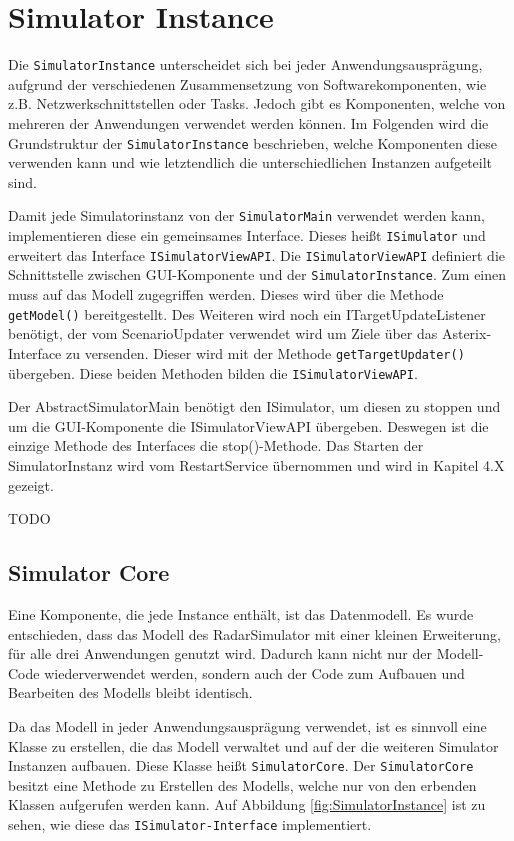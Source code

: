 \section{Simulator Instance}
Die \texttt{SimulatorInstance} unterscheidet sich bei jeder Anwendungsausprägung, aufgrund der verschiedenen Zusammensetzung von Softwarekomponenten, wie z.B. Netzwerkschnittstellen oder Tasks. Jedoch gibt es Komponenten, welche von mehreren der Anwendungen verwendet werden können. Im Folgenden wird die Grundstruktur der \texttt{SimulatorInstance} beschrieben, welche Komponenten diese verwenden kann und wie letztendlich die unterschiedlichen Instanzen aufgeteilt sind. 

Damit jede Simulatorinstanz von der \texttt{SimulatorMain} verwendet werden kann, implementieren diese ein gemeinsames Interface. Dieses heißt \texttt{ISimulator} und erweitert das Interface \texttt{ISimulatorViewAPI}. Die \texttt{ISimulatorViewAPI} definiert die Schnittstelle zwischen GUI-Komponente und der \texttt{SimulatorInstance}. Zum einen muss auf das Modell zugegriffen werden. Dieses wird über die Methode \texttt{getModel()} bereitgestellt. Des Weiteren wird noch ein ITargetUpdateListener benötigt, der vom ScenarioUpdater verwendet wird um Ziele über das Asterix-Interface zu versenden. Dieser wird mit der Methode \texttt{getTargetUpdater()} übergeben. Diese beiden Methoden bilden die \texttt{ISimulatorViewAPI}.

Der AbstractSimulatorMain benötigt den ISimulator, um diesen zu stoppen und um die GUI-Komponente die ISimulatorViewAPI übergeben. Deswegen ist die einzige Methode des Interfaces die stop()-Methode. Das Starten der SimulatorInstanz wird vom RestartService übernommen und wird in Kapitel 4.X gezeigt.

TODO

\subsection{Simulator Core}
Eine Komponente, die jede Instance enthält, ist das Datenmodell. Es wurde entschieden, dass das Modell des RadarSimulator mit einer kleinen Erweiterung, für alle drei Anwendungen genutzt wird. Dadurch kann nicht nur der Modell-Code wiederverwendet werden, sondern auch der Code zum Aufbauen und Bearbeiten des Modells bleibt identisch.

Da das Modell in jeder Anwendungsausprägung verwendet, ist es sinnvoll eine Klasse zu erstellen, die das Modell verwaltet und auf der die weiteren Simulator Instanzen aufbauen. Diese Klasse heißt \texttt{SimulatorCore}. Der \texttt{SimulatorCore} besitzt eine Methode zu Erstellen des Modells, welche nur von den erbenden Klassen aufgerufen werden kann. Auf Abbildung \ref{fig:SimulatorInstance} ist zu sehen, wie diese das \texttt{ISimulator-Interface} implementiert.


